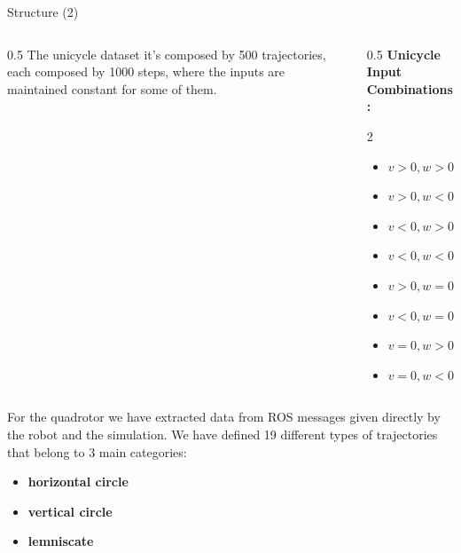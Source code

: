 \documentclass{beamer}
\begin{document}
\begin{frame}{Structure (2)}
    \begin{columns}[T]
        \begin{column}{0.5\textwidth}
            The unicycle dataset it's composed by 500 trajectories, each composed by 1000 steps, where the inputs are maintained constant for some of them.
            \vspace{1em} %
        \end{column}
        
        \begin{column}{0.5\textwidth}
            \vspace{-2.6em}
            \textbf{Unicycle Input Combinations:}
            \begin{multicols}{2}
                \begin{itemize}
                \centering
                \item $v > 0, w > 0$
                \item $v > 0, w < 0$
                \item $v < 0, w > 0$
                \item $v < 0, w < 0$
                \item $v > 0, w = 0$ 
                \item $v < 0, w = 0$
                \item $v = 0, w > 0$
                \item $v = 0, w < 0$
                \end{itemize}
            \end{multicols}
        \end{column}
    \end{columns}
    \vspace{1em}
    For the quadrotor we have extracted data from ROS messages given directly by the robot and the simulation. We have defined 19 different types of trajectories that belong to 3 main categories:
        \begin{itemize}
            \item \textbf{horizontal circle}
            \item \textbf{vertical circle} 
            \item \textbf{lemniscate}
        \end{itemize}
\end{frame}
\end{document}
